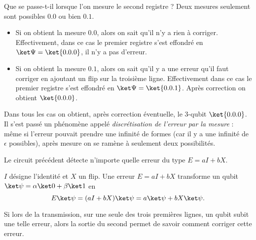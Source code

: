 \documentclass[11pt,class=report,crop=false]{standalone}
\begin{document}
Que se passe-t-il lorsque l'on mesure le second registre ? Deux mesures seulement sont possibles $0.0$ ou bien $0.1$.
\begin{itemize}
  \item Si on obtient la mesure $0.0$, alors on sait qu'il n'y a rien à corriger. Effectivement, dans ce cas le premier registre s'est effondré en $\ket\Psi = \ket{0.0.0}$, il n'y  a pas d'erreur.

  \item Si on obtient la mesure $0.1$, alors on sait qu'il y a une erreur qu'il faut corriger en ajoutant un flip sur la troisième ligne. Effectivement dans ce cas le premier registre s'est effondré en $\ket\Psi = \ket{0.0.1}$. Après correction on obtient $\ket{0.0.0}$.
\end{itemize}

Dans tous les cas on obtient, après correction éventuelle, le $3$-qubit $\ket{0.0.0}$. 
Il s'est passé un phénomène appelé \emph{discrétisation de l'erreur par la mesure} :
même si l'erreur pouvait prendre une infinité de formes (car il y a une infinité de $\epsilon$ possibles), après mesure on se ramène à seulement deux possibilités.

\begin{proposition}
Le circuit précédent détecte n'importe quelle erreur du type $E = aI+bX$.
\end{proposition}




$I$ désigne l'identité et $X$ un flip.
Une erreur $E = aI+bX$ transforme un qubit $\ket\psi = \alpha\ket0+\beta\ket1$ en
$$E\ket\psi = (aI+bX)\ket\psi = a\ket\psi + bX\ket\psi.$$

Si lors de la transmission, sur une seule des trois premières lignes, un qubit subit une telle erreur, alors la sortie du second permet de savoir comment corriger cette erreur.
\end{document}
